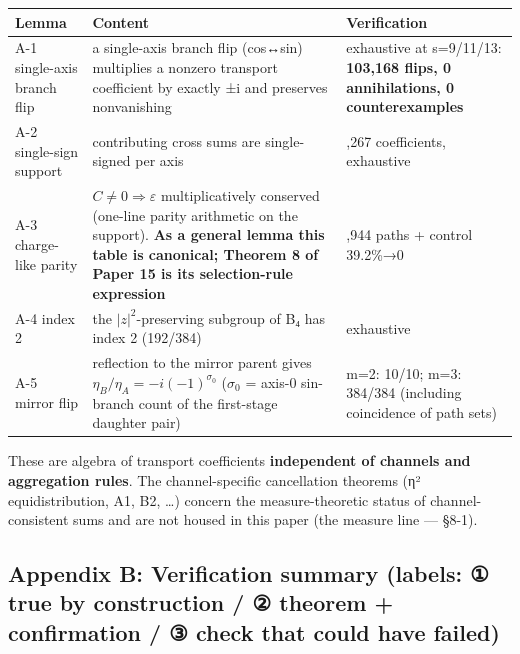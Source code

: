 \documentclass[
]{article}
\newcounter{none} %
\begin{document}
{\def\LTcaptype{none} %
\begin{longtable}[]{@{}
  >{\raggedright\arraybackslash}p{}
  >{\raggedright\arraybackslash}p{}
  >{\raggedright\arraybackslash}p{}@{}}
\toprule\noalign{}
\begin{minipage}[b]{\linewidth}\raggedright
Lemma
\end{minipage} & \begin{minipage}[b]{\linewidth}\raggedright
Content
\end{minipage} & \begin{minipage}[b]{\linewidth}\raggedright
Verification
\end{minipage} \\
\midrule\noalign{}
\endhead
\bottomrule\noalign{}
\endlastfoot
A-1 single-axis branch flip & a single-axis branch flip (cos↔sin)
multiplies a nonzero transport coefficient by exactly ±i and preserves
nonvanishing & exhaustive at s=9/11/13: \textbf{103,168 flips, 0
annihilations, 0 counterexamples} \\
A-2 single-sign support & contributing cross sums are single-signed per
axis & 55,267 coefficients, exhaustive \\
A-3 charge-like parity & \(C\neq0\Rightarrow\varepsilon\)
multiplicatively conserved (one-line parity arithmetic on the support).
\textbf{As a general lemma this table is canonical; Theorem 8 of Paper
15 is its selection-rule expression} & 118,944 paths + control
39.2\%→0 \\
A-4 index 2 & the \(|z|^2\)-preserving subgroup of B₄ has index 2
(192/384) & exhaustive \\
A-5 mirror flip & reflection to the mirror parent gives
\(\eta_B/\eta_A=-i(-1)^{\sigma_0}\) (\(\sigma_0\) = axis-0 sin-branch
count of the first-stage daughter pair) & m=2: 10/10; m=3: 384/384
(including coincidence of path sets) \\
\end{longtable}
}

These are algebra of transport coefficients \textbf{independent of
channels and aggregation rules}. The channel-specific cancellation
theorems (η² equidistribution, A1, B2, \ldots) concern the
measure-theoretic status of channel-consistent sums and are not housed
in this paper (the measure line --- §8-1).

\subsection{Appendix B: Verification summary (labels: ① true by
construction / ② theorem + confirmation / ③ check that could have
failed)}\label{appendix-b-verification-summary-labels-ux2460-true-by-construction-ux2461-theorem-confirmation-ux2462-check-that-could-have-failed}
\end{document}
